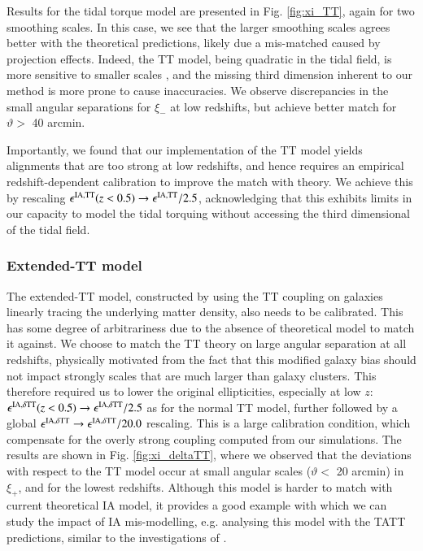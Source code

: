 Results for the tidal torque model are presented in Fig. \ref{fig:xi_TT}, again for two smoothing scales. In this case, we see that the larger smoothing scales agrees better with the theoretical predictions, likely due a mis-matched caused by projection effects. Indeed, the TT model, being quadratic in the tidal field, is more sensitive to smaller scales \citep{TATT}, and the missing third dimension inherent to our method is more prone to cause inaccuracies. We observe discrepancies in the small angular separations for  $\xi_-$ at low redshifts, but achieve better match for $\vartheta>$  40 arcmin.

Importantly, we found that our implementation of the TT model yields alignments that are too strong at low redshifts, and hence requires an empirical redshift-dependent calibration to improve the match with theory. We achieve this by rescaling $\epsilon^{\rm IA, TT}(z<0.5) \rightarrow \epsilon^{\rm IA, TT} /2.5$, acknowledging that this exhibits limits in our capacity to model the tidal torquing without accessing the third dimensional of the tidal field. 







\subsubsection*{Extended-TT model}
\label{subsec:TT}

The extended-TT model, constructed by using the TT coupling on galaxies linearly tracing the underlying matter density, also needs to be calibrated. This has some degree of arbitrariness due to the absence of theoretical model to match it against. We choose to match the TT theory on large angular separation at all redshifts, physically motivated from the fact that this modified galaxy bias should not impact strongly scales that are much larger than galaxy clusters.
This therefore required us to lower the original ellipticities, especially at low $z$: $\epsilon^{{\rm IA}, \delta{\rm TT}}(z<0.5) \rightarrow \epsilon^{{\rm IA}, \delta{\rm TT}} /2.5$ as for the normal TT model, further followed by a global $\epsilon^{{\rm IA}, \delta{\rm TT}} \rightarrow \epsilon^{{\rm IA}, \delta{\rm TT}}/20.0$ rescaling. This is a large calibration condition, which compensate for the overly strong coupling computed from our simulations. The results are shown in Fig. \ref{fig:xi_deltaTT}, where we observed that the deviations with respect to the TT model occur at small angular scales ($\vartheta < $ 20 arcmin) in $\xi_+$, and for the lowest redshifts. Although this model is harder to match with current theoretical IA model, it provides a good example with which we can study the impact of IA mis-modelling, e.g. analysing this model with the TATT predictions, similar to the investigations of \citet{Paopiamsap2024}.


